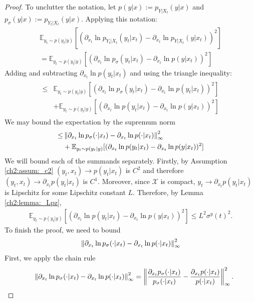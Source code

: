 \begin{proof}
    To unclutter the notation, let $p(y | x) := p_{Y | X_t}(y | x)$ and $p_\sigma(y | x) :=  p_{Y_t | X_t}(y | x)$. Applying this notation:
    \begin{align*}
        \mathbb{E}_{y_t \sim p(y_t|y)}[
            (\partial_{x_t} \ln p_{Y_t | X_t}(y_t | x_t)- \partial_{x_t} \ln p_{Y | X_t}(y | x_t) )^2] \\
        = 
        \mathbb{E}_{y_t \sim p(y_t|y)}[
            (\partial_{x_t} \ln p_\sigma(y_t | x_t) - \partial_{x_t}  \ln p(y | x_t) )^2 ]
    \end{align*}
    Adding and subtracting $\partial_{x_t} \ln p(y_t | x_t)$ and using the triangle inequality:
    \begin{align*}
        \! \begin{aligned} 
            \leq &\mathbb{E}_{y_t \sim p(y_t|y)}[
                (\partial_{x_t} \ln p_\sigma(y_t | x_t) - \partial_{x_t} \ln p(y_t | x_t) )^2] \\
            &+ \mathbb{E}_{y_t \sim p(y_t|y)}[
                (\partial_{x_t} \ln p(y_t | x_t)- \partial_{x_t} \ln p(y | x_t) )^2]
        \end{aligned}
    \end{align*}
    We may bound the expectation by the supremum norm
    \begin{align*}
        \! \begin{aligned} 
            \leq & \left\lVert \partial_{x_t} \ln p_\sigma( \cdot | x_t) - \partial_{x_t} \ln p( \cdot | x_t)  \right\rVert_{\infty}^2 \\
            &+ \mathbb{E}_{y_t \sim p(y_t|y)}[(\partial_{x_t} \ln p(y_t | x_t)- \partial_{x_t} \ln p(y | x_t) )^2]
        \end{aligned}
    \end{align*}
    We will bound each of the summands separately. Firstly, by Assumption \ref{ch2:assum:_c2}  $(y_t, x_t) \to p(y_t | x_t)$ is $C^2$ and therefore $(y_t, x_t) \to \partial_{x_t}p(y_t | x_t)$ is $C^1$. Moreover, since $\mathcal{X}$ is compact,  $y_t \to \partial_{x_t}p(y_t | x_t)$  is Lipschitz for some Lipschitz constant $L$. 
    Therefore, by Lemma \ref{ch2:lemma:_Lpz},
    \begin{align*}
        \mathbb{E}_{y_t \sim p(y_t|y)}[ (\partial_{x_t} \ln p(y_t | x_t)- \partial_{x_t} \ln p(y | x_t) )^2] \leq  L^2 \sigma^y(t)^2.
    \end{align*} 
    To finish the proof, we need to bound $$ \left\lVert \partial_{x_t} \ln p_\sigma( \cdot | x_t) - \partial_{x_t} \ln p( \cdot | x_t)  \right\rVert_{\infty}^2 $$
    First, we apply the chain rule
    \[
\phantom{=}\left\lVert \partial_{x_t} \ln p_\sigma( \cdot | x_t) - \partial_{x_t} \ln p( \cdot | x_t)  \right\rVert_{\infty}^2 
=  \left\lVert  
    \frac{\partial_{x_t} p_{\sigma}( \cdot | x_t)}{ p_{\sigma}( \cdot | x_t)}  
    - \frac{\partial_{x_t} p( \cdot | x_t)}{ p( \cdot | x_t)} 
 \right\rVert_{\infty}^2.
\]


\end{proof}

